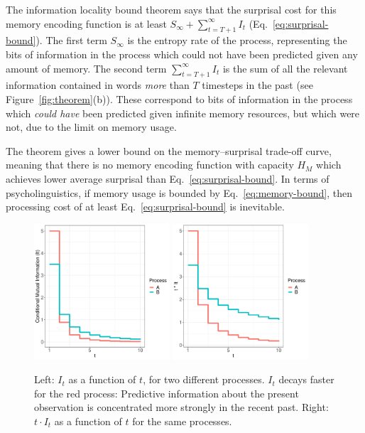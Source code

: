 The information locality bound theorem says that the surprisal cost for this memory encoding function is at least $S_\infty + \sum_{t=T+1}^\infty I_t$ (Eq.~\ref{eq:surprisal-bound}). The first term $S_\infty$ is the entropy rate of the process, representing the bits of information in the process which could not have been predicted given any amount of memory. The second term $\sum_{t=T+1}^\infty I_t$ is the sum of all the relevant information contained in words \emph{more} than $T$ timesteps in the past (see Figure~\ref{fig:theorem}(b)). These correspond to bits of information in the process which \emph{could have} been predicted given infinite memory resources, but which were not, due to the limit on memory usage.

The theorem gives a lower bound on the memory--surprisal trade-off curve, meaning that there is no memory encoding function with capacity $H_M$ which achieves lower average surprisal than Eq.~\ref{eq:surprisal-bound}. In terms of psycholinguistics, if memory usage is bounded by Eq.~\ref{eq:memory-bound}, then processing cost of at least Eq.~\ref{eq:surprisal-bound} is inevitable.

\begin{figure}
\includegraphics[width=0.45\textwidth]{figures/decay.pdf}
\includegraphics[width=0.45\textwidth]{figures/memory.pdf}
%
	\caption{Left: $I_t$ as a function of $t$, for two different processes. $I_t$ decays faster for the red process: Predictive information about the present observation is concentrated more strongly in the recent past. Right: $t \cdot I_t$ as a function of $t$ for the same processes. }\label{fig:basic}
\end{figure}

